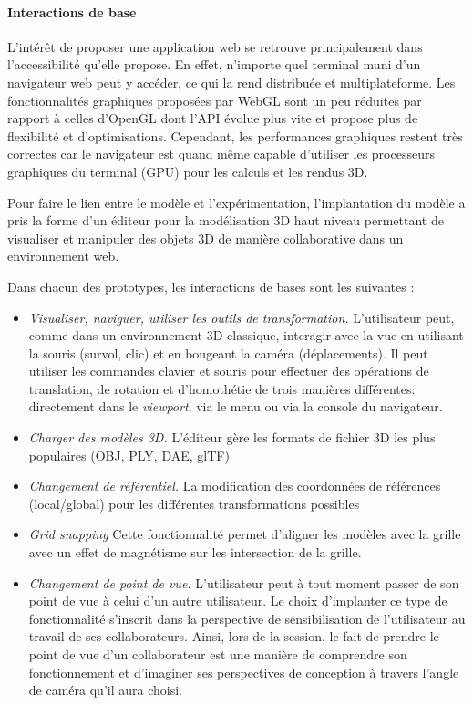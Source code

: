 \paragraph{Interactions de base}
L'intérêt de proposer une application web se retrouve principalement dans 
l'accessibilité qu'elle propose. 
En effet, n'importe quel terminal muni d'un navigateur web peut y accéder, ce qui 
la rend distribuée et multiplateforme. 
Les fonctionnalités graphiques proposées par WebGL sont un peu réduites par 
rapport à celles d'OpenGL dont l'\gls{API} évolue plus vite et propose plus de 
flexibilité et d'optimisations. Cependant, les performances graphiques restent très 
correctes car le navigateur est quand même capable d'utiliser les processeurs 
graphiques du terminal (\gls{GPU}) pour les calculs et les rendus \gls{3D}.

Pour faire le lien entre le modèle et l'expérimentation, l'implantation du modèle a 
pris la forme d'un éditeur pour la modélisation \gls{3D} haut niveau permettant de 
visualiser et manipuler des objets \gls{3D} de manière collaborative dans un 
environnement web.

Dans chacun des prototypes, les interactions de bases sont les suivantes :
\begin{itemize}
	
	\item \textit{Visualiser, naviguer, utiliser les outils de transformation.} 
	L'utilisateur peut, 
	com\-me dans un environnement \gls{3D} classique, interagir avec la vue en 
	utilisant 
	la souris (survol, clic) et en bougeant la caméra (déplacements). Il peut 
	utiliser les commandes clavier et souris pour effectuer des opérations de 
	translation, de rotation et d'homothétie de trois manières différentes: 
	directement dans le \textit{viewport}, via le 
	menu ou via la console du navigateur.
	\item \textit{Charger des modèles \gls{3D}.} L'éditeur gère les formats de 
	fichier 3D les plus populaires (OBJ, PLY, DAE, glTF)
	\item \textit{Changement de référentiel.} La modification des coordonnées de 
	réfé\-ren\-ces (local/global)  pour les différentes transformations possibles
	\item \textit{Grid snapping} Cette fonctionnalité permet d'aligner les modèles 
	avec la 
	grille avec un effet de magnétisme sur les intersection de la grille.
	\item \textit{Changement de point de vue.} L'utilisateur peut à tout moment 
	passer de 
	son point de vue à celui d'un autre utilisateur. Le choix d'implanter ce type de 
	fonctionnalité s'inscrit dans la perspective de sensibilisation de l'utilisateur au 
	travail de ses collaborateurs. Ainsi, lors de la session, le fait de prendre le 
	point de vue d'un collaborateur est une manière de 
	comprendre son fonctionnement et d'imaginer ses 
	perspectives de conception à travers l'angle de caméra qu'il aura choisi.
\end{itemize}

